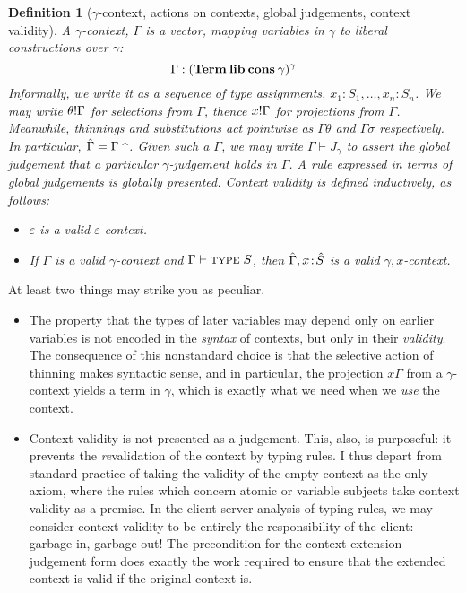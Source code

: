 \documentclass{jfp1}
\newtheorem{definition}[theorem]{Definition}
\newcommand{\emp}{\varepsilon}
\begin{document}
\begin{definition}[$\gamma$-context, actions on contexts, global
  judgements, context validity]
  A $\gamma$-context, $\Gamma$ is a vector, mapping variables in $\gamma$ to
  liberal constructions over $\gamma$:
  \[
    \Gamma : (\mathbf{Term}\:\textbf{lib}\:\textbf{cons}\:\gamma)^\gamma
    \]
  Informally, we write it as a sequence of type assignments,
  $x_1:S_1,\ldots,x_n:S_n$. We may write $\theta!\Gamma$ for selections
  from $\Gamma$, thence $x!\Gamma$ for projections from
  $\Gamma$. Meanwhile, thinnings and substitutions act pointwise as
  $\Gamma\theta$ and $\Gamma\sigma$ respectively. In particular, $\hat\Gamma = \Gamma\uparrow$.
  Given such a $\Gamma$, we may write $\Gamma\vdash J_\gamma$ to assert
  the \emph{global judgement} that a particular $\gamma$-judgement holds in $\Gamma$.
  A rule expressed in terms of global judgements is \emph{globally
    presented}.
  Context \emph{validity} is defined inductively, as follows:
  \begin{itemize}
  \item $\emp$ is a valid $\emp$-context.
  \item If $\Gamma$ is a valid $\gamma$-context and $\Gamma\vdash\textsc{type}\;S$, then $\hat\Gamma,x\!:\!\hat S$ is a valid $\gamma,x$-context.
  \end{itemize}
\end{definition}

At least two things may strike you as peculiar.
\begin{itemize}
\item The property that the types of later variables may depend only on
  earlier variables is not encoded in the \emph{syntax} of contexts,
  but only in their \emph{validity}. The consequence of this
  nonstandard choice is that the selective action of thinning makes
  syntactic sense, and in particular, the projection $x\Gamma$ from a
  $\gamma$-context yields a term in $\gamma$, which is exactly what we
  need when we \emph{use} the context.
\item Context validity is not presented as a
judgement. This, also, is purposeful: it prevents the
\emph{re}validation of the context by typing rules. I thus depart from
standard practice of taking the validity of the empty context as the
only axiom, where the rules which concern atomic or variable subjects
take context validity as a premise. In the client-server analysis of typing
rules, we may consider context validity to be entirely the responsibility
of the client: garbage in, garbage out! The precondition for the context
extension judgement form does exactly the work required to ensure that the
extended context is valid if the original context is.
\end{itemize}
\end{document}
